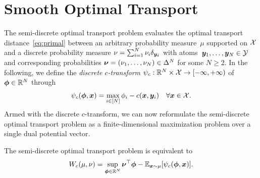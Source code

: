 \documentclass[11pt, a4paper, oneside, reqno]{article}
\begin{document}
	\section{Smooth Optimal Transport}
	\label{sec:smooth_ot}
	The semi-discrete optimal transport problem evaluates the optimal transport distance~\eqref{eq:primal} between an arbitrary probability measure~$\mu$ supported on $\mathcal{X}$ and a discrete probability measure $\nu = \sum_{i=1}^N {\nu}_i\delta_{\boldsymbol {y_i}}$ with atoms~$\boldsymbol y_1,\ldots, \boldsymbol {y}_N \in \mathcal{Y}$ and corresponding probabilities $\boldsymbol \nu =(\nu_1,\ldots, \nu_N)\in \Delta^N$ for some $N\ge 2$. 
	In the following, we define the {\em discrete $c$-transform} $\psi_c:\mathbb{R}^N\times \mathcal{X} \rightarrow [-\infty,+\infty)$ of $\boldsymbol\phi\in\mathbb{R}^N$ through
	\begin{equation}
	\label{eq:disc-c-transform}
	\psi_c(\boldsymbol \phi, \boldsymbol x) = \max\limits_{i \in [N]} \phi_i - c(\boldsymbol x, \boldsymbol y_i) \quad \forall \boldsymbol x \in \mathcal{X}.
	\end{equation}
	Armed with the discrete $c$-transform, we can now reformulate the semi-discrete optimal transport problem as a finite-dimensional maximization problem over a single dual potential vector.
	\begin{lemma}
		\label{lem:disc_ctrans}
		The semi-discrete optimal transport problem is equivalent to 
		\begin{equation}
		\label{eq:ctans_dual_semidisc}
		W_c(\mu, \nu) = \sup_{ \boldsymbol{\phi} \in \mathbb{R}^N} \boldsymbol {\nu}^\top \boldsymbol {\phi} - \mathbb{E}_{\boldsymbol x \sim \mu}[{\psi_c(\boldsymbol \phi, \boldsymbol x) } ].
		\end{equation}
	\end{lemma}
\end{document}
